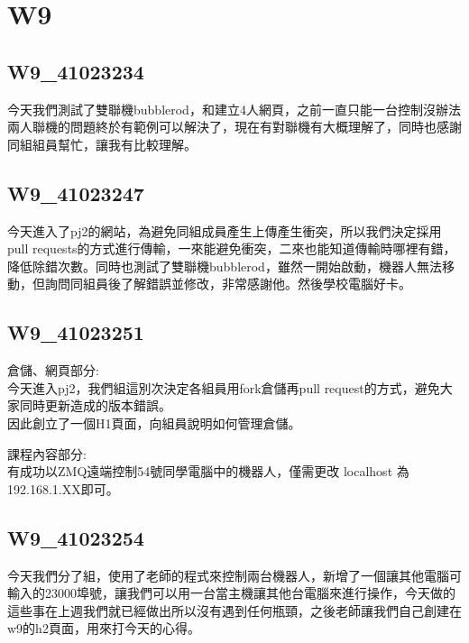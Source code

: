 \chapter{W9}
\section{W9_41023234}
今天我們測試了雙聯機bubblerod，和建立4人網頁，之前一直只能一台控制沒辦法兩人聯機的問題終於有範例可以解決了，現在有對聯機有大概理解了，同時也感謝同組組員幫忙，讓我有比較理解。\\
\section{W9_41023247}
今天進入了pj2的網站，為避免同組成員產生上傳產生衝突，所以我們決定採用pull requests的方式進行傳輸，一來能避免衝突，二來也能知道傳輸時哪裡有錯，降低除錯次數。同時也測試了雙聯機bubblerod，雖然一開始啟動，機器人無法移動，但詢問同組員後了解錯誤並修改，非常感謝他。然後學校電腦好卡。\\
\section{W9_41023251}
倉儲、網頁部分:\\

今天進入pj2，我們組這別次決定各組員用fork倉儲再pull request的方式，避免大家同時更新造成的版本錯誤。\\
因此創立了一個H1頁面，向組員說明如何管理倉儲。\par


課程內容部分:\\

有成功以ZMQ遠端控制54號同學電腦中的機器人，僅需更改 localhost 為192.168.1.XX即可。\par
\section{W9_41023254}
今天我們分了組，使用了老師的程式來控制兩台機器人，新增了一個讓其他電腦可輸入的23000埠號，讓我們可以用一台當主機讓其他台電腦來進行操作，今天做的這些事在上週我們就已經做出所以沒有遇到任何瓶頸，之後老師讓我們自己創建在w9的h2頁面，用來打今天的心得。